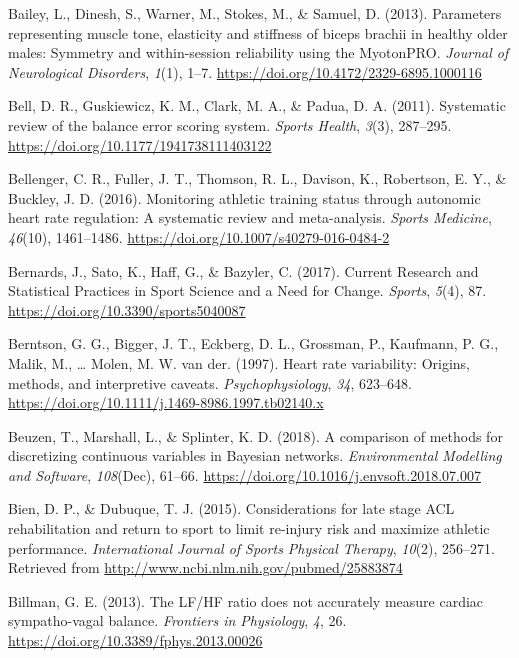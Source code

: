 \documentclass[
  english,
  man,floatsintext]{apa6}
\begin{document}
\leavevmode\hypertarget{ref-Bailey2013}{}%
Bailey, L., Dinesh, S., Warner, M., Stokes, M., \& Samuel, D. (2013). Parameters representing muscle tone, elasticity and stiffness of biceps brachii in healthy older males: Symmetry and within-session reliability using the MyotonPRO. \emph{Journal of Neurological Disorders}, \emph{1}(1), 1--7. \url{https://doi.org/10.4172/2329-6895.1000116}

\leavevmode\hypertarget{ref-Bell2011}{}%
Bell, D. R., Guskiewicz, K. M., Clark, M. A., \& Padua, D. A. (2011). Systematic review of the balance error scoring system. \emph{Sports Health}, \emph{3}(3), 287--295. \url{https://doi.org/10.1177/1941738111403122}

\leavevmode\hypertarget{ref-Bellenger2016}{}%
Bellenger, C. R., Fuller, J. T., Thomson, R. L., Davison, K., Robertson, E. Y., \& Buckley, J. D. (2016). Monitoring athletic training status through autonomic heart rate regulation: A systematic review and meta-analysis. \emph{Sports Medicine}, \emph{46}(10), 1461--1486. \url{https://doi.org/10.1007/s40279-016-0484-2}

\leavevmode\hypertarget{ref-Bernards2017}{}%
Bernards, J., Sato, K., Haff, G., \& Bazyler, C. (2017). Current Research and Statistical Practices in Sport Science and a Need for Change. \emph{Sports}, \emph{5}(4), 87. \url{https://doi.org/10.3390/sports5040087}

\leavevmode\hypertarget{ref-Berntson1997}{}%
Berntson, G. G., Bigger, J. T., Eckberg, D. L., Grossman, P., Kaufmann, P. G., Malik, M., \ldots{} Molen, M. W. van der. (1997). Heart rate variability: Origins, methods, and interpretive caveats. \emph{Psychophysiology}, \emph{34}, 623--648. \url{https://doi.org/10.1111/j.1469-8986.1997.tb02140.x}

\leavevmode\hypertarget{ref-Beuzen2018}{}%
Beuzen, T., Marshall, L., \& Splinter, K. D. (2018). A comparison of methods for discretizing continuous variables in Bayesian networks. \emph{Environmental Modelling and Software}, \emph{108}(Dec), 61--66. \url{https://doi.org/10.1016/j.envsoft.2018.07.007}

\leavevmode\hypertarget{ref-Bien2015}{}%
Bien, D. P., \& Dubuque, T. J. (2015). Considerations for late stage ACL rehabilitation and return to sport to limit re-injury risk and maximize athletic performance. \emph{International Journal of Sports Physical Therapy}, \emph{10}(2), 256--271. Retrieved from \url{http://www.ncbi.nlm.nih.gov/pubmed/25883874}

\leavevmode\hypertarget{ref-Billman2013}{}%
Billman, G. E. (2013). The LF/HF ratio does not accurately measure cardiac sympatho-vagal balance. \emph{Frontiers in Physiology}, \emph{4}, 26. \url{https://doi.org/10.3389/fphys.2013.00026}
\end{document}
